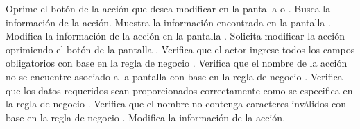  \begin{UCtrayectoria}	
	\UCpaso[\UCactor] Oprime el botón \btnEditar de la acción que desea modificar en la pantalla  o .
	\UCpaso[\UCsist] Busca la información de la acción.
    \UCpaso[\UCsist] Muestra la información encontrada en la pantalla .
    \UCpaso[\UCactor] Modifica la información de la acción en la pantalla . \label{cu6.1.2:ingresaDatos}
    \UCpaso[\UCactor] Solicita modificar la acción oprimiendo el botón  de la pantalla . 
    \UCpaso[\UCsist] Verifica que el actor ingrese todos los campos obligatorios con base en la regla de negocio  . 
    \UCpaso[\UCsist] Verifica que el nombre de la acción no se encuentre asociado a la pantalla con base en la regla de negocio . 
    \UCpaso[\UCsist] Verifica que los datos requeridos sean proporcionados correctamente como se especifica en la regla de negocio .    
    \UCpaso[\UCsist] Verifica que el nombre no contenga caracteres inválidos con base en la regla de negocio . 
    \UCpaso[\UCsist] Modifica la información de la acción.
 \end{UCtrayectoria}
 

